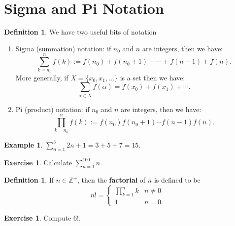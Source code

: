 \documentclass[a4paper, 10pt]{amsart}
\theoremstyle{definition}
\newtheorem{defn}[thm]{Definition}
\newtheorem{ex}[thm]{Example}
\newtheorem{exercise}[thm]{Exercise}
\theoremstyle{remark}
\begin{document}
\section{Sigma and Pi Notation}
\begin{defn}
  We have two useful bits of notation
  \begin{enumerate}
    \item Sigma (summation) notation: if $ n_0 $ and $ n $ are integers, then we have:
          \begin{displaymath}
            \sum^{n}_{k = n_0} f(k) := f(n_0) + f(n_0 + 1) + \cdots + f(n - 1) + f(n).
          \end{displaymath}
          More generally, if $ X = \{x_0, x_1, \dots \} $ is a set then we have:
          \begin{displaymath}
            \sum_{\alpha \in X} f(\alpha) = f(x_0) + f(x_1) + \cdots.
          \end{displaymath}
    \item Pi (product) notation: if $ n_0 $ and $ n $ are integers, then we have:
          \begin{displaymath}
            \prod^{n}_{k = n_0} f(k) := f(n_0) f(n_0 + 1) \cdots f(n - 1) f(n).
          \end{displaymath}
  \end{enumerate}
\end{defn}

\begin{ex}
  $ \sum_{n = 1}^{3} 2n + 1 = 3 + 5 + 7 = 15 $.
\end{ex}

\begin{exercise}
  Calculate $ \sum_{n = 1}^{100} n $.
\end{exercise}

\begin{defn}
  If $ n \in \mathbb{Z}^+ $, then the \textbf{factorial} of $ n $ is defined to be
  \begin{displaymath}
    n! = \begin{cases}
           \prod_{k = 1}^{n} k & n \neq 0\\
           1 & n = 0.
         \end{cases}
  \end{displaymath}
\end{defn}

\begin{exercise}
  Compute 6!.
\end{exercise}
\end{document}
